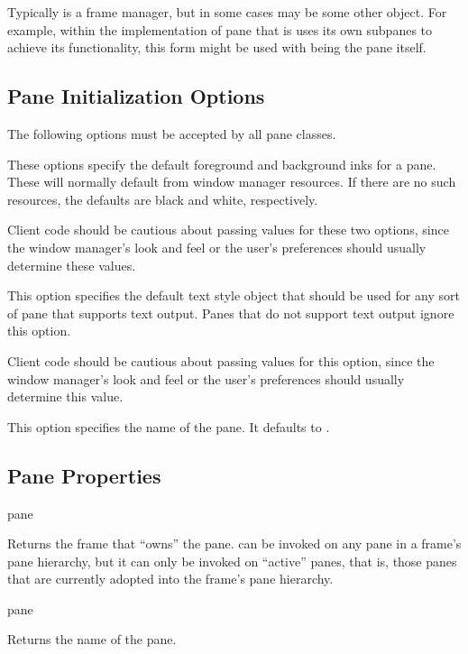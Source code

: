 Typically  is a frame manager, but in some cases 
may be some other object.  For example, within the implementation of pane that
is uses its own subpanes to achieve its functionality, this form might be used
with  being the pane itself.


\subsection {Pane Initialization Options \label{pane-init}}

The following options must be accepted by all pane classes.


These options specify the default foreground and background inks for a pane.
These will normally default from window manager resources.  If there are no such
resources, the defaults are black and white, respectively.

Client code should be cautious about passing values for these two options, since
the window manager's look and feel or the user's preferences should usually
determine these values.


This option specifies the default text style object that should be used for
any sort of pane that supports text output.  Panes that do not support text
output ignore this option.

Client code should be cautious about passing values for this option, since the
window manager's look and feel or the user's preferences should usually
determine this value.


This option specifies the name of the pane.  It defaults to .


\subsection {Pane Properties}

 {pane}

Returns the frame that ``owns'' the pane.   can be invoked on any
pane in a frame's pane hierarchy, but it can only be invoked on ``active''
panes, that is, those panes that are currently adopted into the frame's pane
hierarchy.

 {pane}

Returns the name of the pane.

